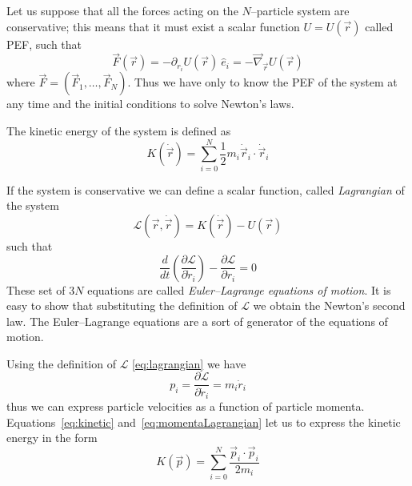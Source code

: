 Let us suppose that all the forces acting on the $N$--particle system are conservative; this means that it must
exist a scalar function $U = U(\vec r)$ called \ac{PEF}, such that
\begin{equation}
	\vec F(\vec r) = -\partial_{r_i} U(\vec r)\ \hat e_i = -\vec\nabla_{\vec r} U(\vec r)
	\label{eq:pefForces}
\end{equation}
where $\vec F = (\vec F_1,\dots, \vec F_N)$. Thus we have only to know the \ac{PEF} of the system at any time and 
the initial conditions to solve Newton's laws.

The kinetic energy of the system is defined as
\begin{equation}
	K(\dot{\vec r}) = \sum_{i=0}^{N}\frac{1}{2}m_i \dot{\vec r}_i\cdot \dot{\vec r}_i
	\label{eq:kinetic}
\end{equation}

If the system is conservative we can define a scalar function, called \textit{Lagrangian} of the system
\begin{equation}
	\mathcal{L}(\vec r,\dot{\vec r}) = K(\dot{\vec r}) - U(\vec r)
	\label{eq:lagrangian}
\end{equation}
such that
\begin{equation}
	\frac{d}{dt}\left ( \frac{\partial \mathcal{L}}{\partial \dot r_{i}}\right ) - \frac{\partial\mathcal{L}}{\partial r_{i}} = 0
	\label{eq:EulerLagrange}
\end{equation}
These set of $3N$ equations are called \textit{Euler--Lagrange equations of motion}. It is easy to show that 
substituting the definition of $\mathcal{L}$ we obtain the Newton's second law. The Euler--Lagrange equations are 
a sort of generator of the equations of motion.

Using the definition of $\mathcal{L}$ \eqref{eq:lagrangian} we have
\begin{equation}
	p_i = \frac{\partial\mathcal{L}}{\partial \dot r_i} = m_i\dot r_i
	\label{eq:momentaLagrangian}
\end{equation}
thus we can express particle velocities as a function of particle momenta. Equations~\eqref{eq:kinetic}
and~\eqref{eq:momentaLagrangian} let us to express the kinetic energy in the form
\begin{equation}
	K(\vec p) = \sum_{i=0}^N \frac{\vec p_i \cdot \vec p_i}{2m_i}
	\label{eq:kineticP}
\end{equation}

